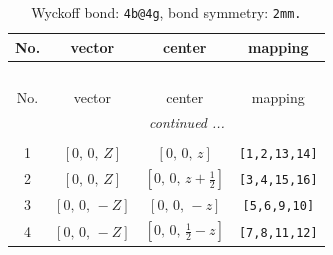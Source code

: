 \documentclass[fleqn,8pt]{jsarticle}
\begin{document}
\begin{longtable}{cccc}
\caption{Wyckoff bond: {\tt 4b@4g}, bond symmetry: {\tt 2mm.}}
 \\
 \hline \hline
No. & vector & center & mapping \\ \hline \endfirsthead

\multicolumn{3}{l}{\tablename\ \thetable{}} \\
 \hline \hline
No. & vector & center & mapping \\ \hline \endhead

 \hline \hline
\multicolumn{3}{r}{\footnotesize\it continued ...} \\ \endfoot

 \hline \hline
\multicolumn{3}{r}{} \\ \endlastfoot

1 & $\left[ 0,\, 0,\, Z \right]$ & $\left[ 0,\, 0,\, z \right]$ & {\tt [1,2,13,14]} \\ \hline
2 & $\left[ 0,\, 0,\, Z \right]$ & $\left[ 0,\, 0,\, z + \frac{1}{2} \right]$ & {\tt [3,4,15,16]} \\ \hline
3 & $\left[ 0,\, 0,\, - Z \right]$ & $\left[ 0,\, 0,\, - z \right]$ & {\tt [5,6,9,10]} \\ \hline
4 & $\left[ 0,\, 0,\, - Z \right]$ & $\left[ 0,\, 0,\, \frac{1}{2} - z \right]$ & {\tt [7,8,11,12]} \\
\end{longtable}
\renewcommand{\arraystretch}{1.2}
\end{document}
